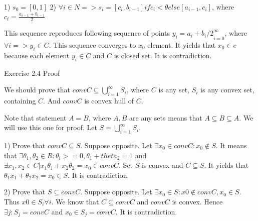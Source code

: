 1) $s_0 = [0, 1]$
2) $\forall i \in N => s_i = [c_i, b_{i-1}] if c_i < \theta else
[a_{i-1}, c_i]$, where $c_i = \frac{a_{i-1} + b_{i-1}}{2}$

This sequence reproduces following sequence of points ${y_i = {a_i + b_i / 2}}_{i=0}^{\infty}$, where
$\forall i => y_i \in C$. This sequence converges to $x_0$ element. It yields that $x_0 \in c$ because each element $y_i \in C$ and $C$ is closed set. It is contradiction.

Exercise 2.4 Proof

We should prove that $conv C \subseteq \bigcup _{i=1}^{\infty} S_{i}$, where $C$ is any set, $S_{i}$
is any convex set, containing $C$. And $conv C$ is convex hull of $C$.

Note that statement $A = B$, where $A, B$ are any sets means that $A \subseteq B \subseteq A$. We will use this one for proof. Let $S = \bigcup _{i=1}^{\infty} S_{i}$.

1) Prove that $conv C \subseteq S$. Suppose opposite. Let $\exists x_{0} \in conv C : x_{0} \notin S$.
It means that $\exists \theta_1, \theta_2 \in R : \theta_i >= 0, \theta_1 + theta_2 = 1$ and $\exists x_1, x_2 \in C | x_1 \theta_1 + x_2 \theta_2 = x_0 \in conv C$. Set $S$ is convex and $C \subseteq S$. It yields that $\theta_1 x_1 + \theta_2 x_2 = x_0 \in S$. It is contradiction.

2) Prove that $S \subseteq conv C$. Suppose opposite. Let $\exists x_0 \in S : x0 \notin conv C, x_0 \in S$. Thus $x0 \in S_i \forall i$. We know that $C \subseteq conv C$ and $conv C$ is convex. Hence $\exists j : S_j = conv C$ and $x_0 \in S_j = conv C$. It is contradiction.

